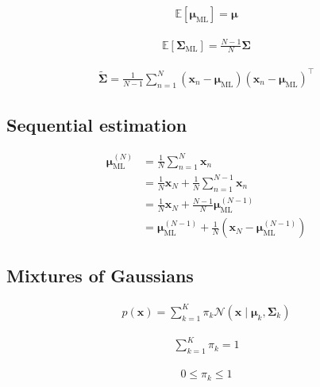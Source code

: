 \documentclass{article}
\begin{document}
\begin{align*}
\mathbb{E}\left[\boldsymbol{\mu}_{\mathrm{ML}}\right] = \boldsymbol{\mu}
\tag{3.107}
\end{align*}

\begin{align*}
\mathbb{E}\left[\boldsymbol{\Sigma}_{\mathrm{ML}}\right] = \frac{N-1}{N} \boldsymbol{\Sigma}
\tag{3.108}
\end{align*}

\begin{align*}
\widetilde{\boldsymbol{\Sigma}} = \frac{1}{N-1} \sum_{n=1}^{N}\left(\mathbf{x}_{n} - \boldsymbol{\mu}_{\mathrm{ML}}\right)\left(\mathbf{x}_{n} - \boldsymbol{\mu}_{\mathrm{ML}}\right)^{\top}
\tag{3.109}
\end{align*}

\subsection{Sequential estimation}

\begin{align*}
\boldsymbol{\mu}_{\mathrm{ML}}^{(N)} 
& = \frac{1}{N} \sum_{n=1}^{N} \mathbf{x}_{n} \\
& = \frac{1}{N} \mathbf{x}_{N} + \frac{1}{N} \sum_{n=1}^{N-1} \mathbf{x}_{n} \\
& = \frac{1}{N} \mathbf{x}_{N} + \frac{N-1}{N} \boldsymbol{\mu}_{\mathrm{ML}}^{(N-1)} \\
& = \boldsymbol{\mu}_{\mathrm{ML}}^{(N-1)} + \frac{1}{N} \left(\mathbf{x}_{N} - \boldsymbol{\mu}_{\mathrm{ML}}^{(N-1)}\right)
\tag{3.110}
\end{align*}

\subsection{Mixtures of Gaussians}

\begin{align*}
p(\mathbf{x}) = \sum_{k=1}^{K} \pi_{k} \mathcal{N}\left(\mathbf{x} \mid \boldsymbol{\mu}_{k}, \boldsymbol{\Sigma}_{k}\right)
\tag{3.111}
\end{align*}

\begin{align*}
\sum_{k=1}^{K} \pi_{k} = 1 
\tag{3.112}
\end{align*}

\begin{align*}
0 \leqslant \pi_{k} \leqslant 1
\tag{3.113}
\end{align*}
\end{document}

